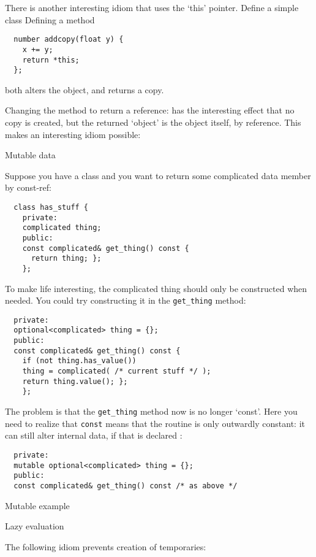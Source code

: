 There is another interesting idiom that uses the `this' pointer.
Define a simple class
%
%
Defining a method
\begin{lstlisting}
  number addcopy(float y) {
    x += y;
    return *this;
  };
\end{lstlisting}
both alters the object, and returns a copy.

Changing the method to return a reference:
%
%
has the interesting effect that no copy is created,
but the returned `object' is the object itself,
by reference.
This makes an interesting idiom possible:
%

 {Mutable data}

Suppose you have a class and you want to return
some complicated data member by const-ref:
\begin{lstlisting}
  class has_stuff {
    private:
    complicated thing;
    public:
    const complicated& get_thing() const {
      return thing; };
    };
\end{lstlisting}
To make life interesting, the complicated thing
should only be constructed when needed.
You could try constructing it in the \lstinline{get_thing} method:
\begin{lstlisting}
  private:
  optional<complicated> thing = {};
  public:
  const complicated& get_thing() const {
    if (not thing.has_value())
    thing = complicated( /* current stuff */ );
    return thing.value(); };
    };  
\end{lstlisting}
The problem is that the \lstinline{get_thing} method now
is no longer `const'.
Here you need to realize that \lstinline{const} means that the routine
is only outwardly constant: it can still alter internal data,
if that is declared :
\begin{lstlisting}
  private:
  mutable optional<complicated> thing = {};
  public:
  const complicated& get_thing() const /* as above */
\end{lstlisting}

\begin{block}{Mutable example}
  \label{sl:with-mutable}
\end{block}

 {Lazy evaluation}

The following idiom prevents creation of temporaries:
\begin{multicols}{2}
\end{multicols}

